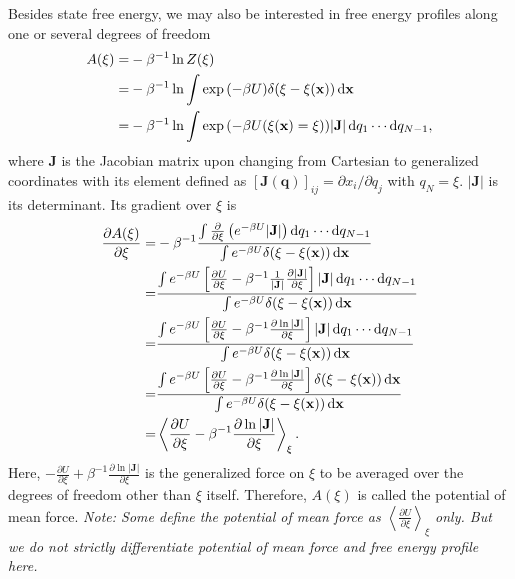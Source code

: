 Besides state free energy, we may also be interested in free energy profiles along one or several degrees of freedom
\begin{align}
	A(\xi)=&-\beta^{-1}\ln{Z(\xi)}\notag\\
	      =&-\beta^{-1}\ln\int \exp{\left(-\beta U\right)}\delta(\xi-\xi(\mathbf{x}))\mathop{}\!\mathrm{d}\mathbf{x}\notag\\
	      =&-\beta^{-1}\ln\int \exp{\left(-\beta U(\xi(\mathbf{x})=\xi)\right)}|\mathbf{J}|\mathop{}\!\mathrm{d} q_1\cdots \mathop{}\!\mathrm{d} q_{N-1},
\end{align}
where $\mathbf{J}$ is the Jacobian matrix upon changing from Cartesian to generalized coordinates with its element defined as $\left[\mathbf{J}(\mathbf{q})\right]_{ij}=\partial x_i/\partial q_j$ with $q_N=\xi$. $|\mathbf{J}|$ is its determinant. Its gradient over $\xi$ is
\begin{align}
\frac{\partial A(\xi)}{\partial \xi}=&-\beta^{-1}\frac{\int \frac{\partial}{\partial \xi}\left(e^{-\beta U}|\mathbf{J}|\right)\diff q_1\cdots \diff q_{N-1}}{\int e^{-\beta U}\delta(\xi-\xi(\mathbf{x}))\diff\mathbf{x}}\notag\\
                                    =&\frac{\int e^{-\beta U}\left[\frac{\partial U}{\partial \xi}-\beta^{-1}\frac{1}{|\mathbf{J}|}\frac{\partial |\mathbf{J}|}{\partial \xi}\right]|\mathbf{J}|\diff q_1\cdots \diff q_{N-1}}{\int e^{-\beta U}\delta(\xi-\xi(\mathbf{x}))\diff \mathbf{x}}\notag\\
                                    =&\frac{\int e^{-\beta U}\left[\frac{\partial U}{\partial \xi}-\beta^{-1}\frac{\partial \ln|\mathbf{J}|}{\partial \xi}\right]|\mathbf{J}|\diff q_1\cdots \diff q_{N-1}}{\int e^{-\beta U}\delta(\xi-\xi(\mathbf{x}))\diff \mathbf{x}}\notag\\
                                    =&\frac{\int e^{-\beta U}\left[\frac{\partial U}{\partial \xi}-\beta^{-1}\frac{\partial \ln|\mathbf{J}|}{\partial \xi}\right]\delta(\xi-\xi(\mathbf{x}))\diff\mathbf{x}}{\int e^{-\beta U}\delta(\xi-\xi(\mathbf{x}))\diff \mathbf{x}}\notag\\
                                    =&\left<\frac{\partial U}{\partial \xi}-\beta^{-1}\frac{\partial \ln |\mathbf{J}|}{\partial \xi}\right>_\xi.
                                    \label{Eq:Intro:meanforce}
\end{align}
Here, $-\frac{\partial U}{\partial \xi}+\beta^{-1}\frac{\partial \ln |\mathbf{J}|}{\partial \xi}$ is the generalized force on $\xi$ to be averaged over the degrees of freedom other than $\xi$ itself. Therefore, $A(\xi)$ is called the potential of mean force. \textit{Note: Some define the potential of mean force as $\left<\frac{\partial U}{\partial \xi}\right>_\xi$ only. But we do not strictly differentiate potential of mean force and free energy profile here.}

